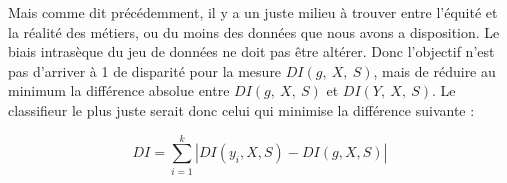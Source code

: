 Mais comme dit précédemment, il y a un juste milieu à trouver entre l’équité et la réalité des métiers, ou du moins des données que nous avons a disposition. Le biais intrasèque du jeu de données ne doit pas être altérer. Donc l’objectif n’est pas d’arriver à 1 de disparité pour la mesure $DI\left(g,\ X,\ S\right)$, mais de réduire au minimum la différence absolue entre $DI\left(g,\ X,\ S\right)$ et $DI\left(Y,\ X,\ S\right)$. Le classifieur le plus juste serait donc celui qui minimise la différence suivante :

$$ DI = \sum_{i=1}^{k} | DI(y_i,X,S)- DI(g,X,S)| $$


